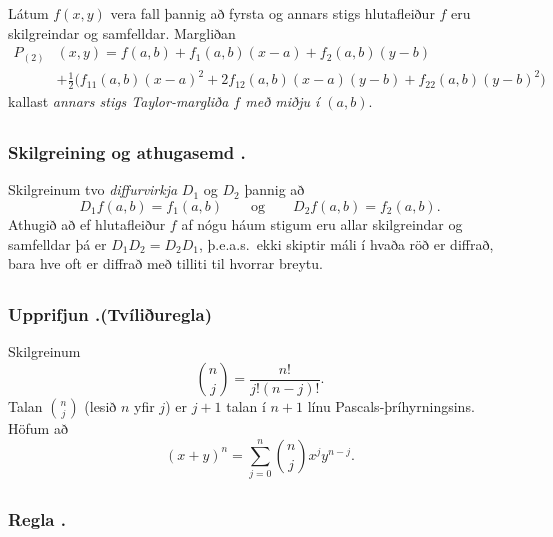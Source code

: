 Látum $f(x,y)$ vera fall þannig að fyrsta og annars
stigs hlutafleiður $f$ eru skilgreindar og samfelldar.  Margliðan
\begin{align*}P_{(2)}&(x,y)=f(a,b)+f_1(a,b)(x-a)+f_2(a,b)(y-b)\\
&+\frac{1}{2}\big(f_{11}(a,b)(x-a)^2+
2f_{12}(a,b)(x-a)(y-b)+f_{22}(a,b)(y-b)^2\big)
\end{align*}
kallast {\em annars stigs Taylor-margliða $f$ með miðju í $(a,b)$}.  






\subsection{} 

\subsubsection{Skilgreining og athugasemd \kaflanr.}
Skilgreinum tvo {\em diffurvirkja} $D_1$ og $D_2$ þannig að 
$$D_1f(a,b)=f_1(a,b)\qquad\mbox{og}\qquad
D_2f(a,b)=f_2(a,b).$$
Athugið að ef hlutafleiður $f$ af nógu háum stigum eru allar skilgreindar og samfelldar þá er $D_1D_2=D_2D_1$, þ.e.a.s.\ ekki skiptir máli í hvaða röð er diffrað, bara hve oft er diffrað með tilliti til hvorrar breytu.






\subsection{} 

\subsubsection{Upprifjun \kaflanr.(Tvíliðuregla)}
Skilgreinum 
$${n\choose j}=\frac{n!}{j!(n-j)!}.$$
Talan ${n\choose j}$ (lesið $n$ yfir $j$) er $j+1$ talan í $n+1$ línu Pascals-þríhyrningsins.
 Höfum að 
$$(x+y)^n=\sum_{j=0}^n \textstyle{n\choose j}x^jy^{n-j}.$$






\subsection{} 

\subsubsection{Regla \kaflanr.}

